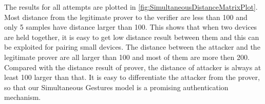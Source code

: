 
The results for all attempts are plotted in \autoref{fig:SimultaneousDistanceMatrixPlot}. Most distance from the legitimate prover to the verifier are less than 100 and only 5 samples have distance larger than 100. This shows that when two devices are held together, it is easy to get low distance result between them and this can be exploited for pairing small devices. The distance between the attacker and the legitimate prover are all larger than 100 and most of them are more then 200. Compared with the distance result of prover, the distance of attacker is always at least 100 larger than that. It is easy to differentiate the attacker from the prover, so that our Simultaneous Gestures model is a promising authentication mechanism. 






 

